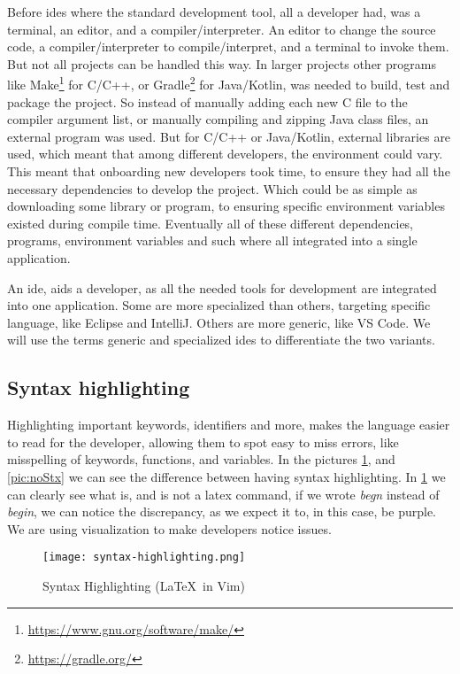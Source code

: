 Before \gls*{ide}s where the standard development tool, all a developer had, was
a terminal, an editor, and a compiler/interpreter. An editor to change the
source code, a compiler/interpreter to compile/interpret, and a terminal to
invoke them. But not all projects can be handled this way. In larger projects
other programs like
Make\footnote{\url{https://www.gnu.org/software/make/}} for C/C++, or
Gradle\footnote{\url{https://gradle.org/}} for Java/Kotlin, was needed to
build, test and package the project. So instead of manually adding each new C
file to the compiler argument list, or manually compiling and zipping Java class
files, an external program was used. But for C/C++ or Java/Kotlin, external
libraries are used, which meant that among different developers, the environment
could vary. This meant that onboarding new developers took time, to ensure they
had all the necessary dependencies to develop the project. Which could be as
simple as downloading some library or program, to ensuring specific environment
variables existed during compile time. Eventually all of these different
dependencies, programs, environment variables and such where all integrated into
a single application.

An \gls*{ide}, aids a developer, as all the needed tools for development are
integrated into one application. Some are more specialized than others,
targeting specific language, like Eclipse and IntelliJ. Others are
more generic, like VS Code. We will use the terms generic and specialized
\gls*{ide}s to differentiate the two variants.


\subsection{Syntax highlighting}

Highlighting important keywords, identifiers and more, makes the language easier
to read for the developer, allowing them to spot easy to miss errors, like
misspelling of keywords, functions, and variables. In the pictures
\ref{pic:stx}, and \ref{pic:noStx} we can see the difference between having
syntax highlighting. In \ref{pic:stx} we can clearly see what is, and is not a
latex command, if we wrote \textit{begn} instead of \textit{begin}, we can
notice the discrepancy, as we expect it to, in this case, be purple. We are
using visualization to make developers notice issues.

\begin{figure}
  \centering
  \texttt{[image: syntax-highlighting.png]}
  \caption{Syntax Highlighting (\LaTeX\ in Vim)}
  \label{pic:stx}
\end{figure}

